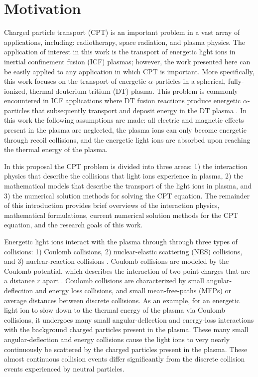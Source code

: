 \section{Motivation}
Charged particle transport (CPT) is an important problem in a vast array of applications, including: radiotherapy, space radiation, and plasma physics. The application of interest in this work is the transport of energetic light ions in inertial confinement fusion (ICF) plasmas; however, the work presented here can be easily applied to any application in which CPT is important. More specifically, this work focuses on the transport of energetic $\alpha$-particles in a spherical, fully-ionized, thermal deuterium-tritium (DT) plasma. This problem is commonly encountered in ICF applications where DT fusion reactions produce energetic $\alpha$-particles that subsequently transport and deposit energy in the DT plasma \cite{Bellan-2006}. In this work the following assumptions are made: all electric and magnetic effects present in the plasma are neglected, the plasma ions can only become energetic through recoil collisions, and the energetic light ions are absorbed upon reaching the thermal energy of the plasma.

In this proposal the CPT problem is divided into three areas: 1) the interaction physics that describe the collisions that light ions experience in plasma, 2) the mathematical models that describe the transport of the light ions in plasma, and 3) the numerical solution methods for solving the CPT equation. The remainder of this introduction provides brief overviews of the interaction physics, mathematical formulations, current numerical solution methods for the CPT equation, and the research goals of this work.

Energetic light ions interact with the plasma through through three types of collisions: 1) Coulomb collisions, 2) nuclear-elastic scattering (NES) collisions, and 3) nuclear-reaction collisions \cite{Perkins-1981} \cite{Hale-1983}. Coulomb collisions are modeled by the Coulomb potential, which describes the interaction of two point charges that are a distance $r$ apart \cite{Bellan-2006}. Coulomb collisions are characterized by small angular-deflection and energy loss collisions, and small mean-free-paths (MFPs) or average distances between discrete collisions. As an example, for an energetic light ion to slow down to the thermal energy of the plasma via Coulomb collisions, it undergoes many small angular-deflection and energy-loss interactions with the background charged particles present in the plasma. These many small angular-deflection and energy collisions cause the light ions to very nearly continuously be scattered by the charged particles present in the plasma. These almost continuous collision events differ significantly from the discrete collision events experienced by neutral particles. 

